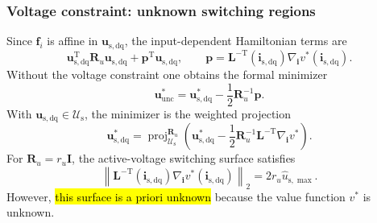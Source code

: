 \begin{frame}
	\frametitle{Voltage constraint: unknown switching regions}
	Since $\bm{f}_i$ is affine in $\bm{u}_{\mathrm{s,dq}}$, the input-dependent Hamiltonian terms are
	\begin{equation*}
		\bm{u}_{\mathrm{s,dq}}^{\mathrm{T}}\bm{R}_u\bm{u}_{\mathrm{s,dq}}
		+\bm{p}^{\mathrm{T}}\bm{u}_{\mathrm{s,dq}},
		\qquad
		\bm{p}=\bm{L}^{-\mathrm{T}}(\bm{i}_{\mathrm{s,dq}})
		\nabla_{\bm{i}}v^*(\bm{i}_{\mathrm{s,dq}}).
	\end{equation*}\pause%
	Without the voltage constraint one obtains the formal minimizer
	\begin{equation*}
		\bm{u}_{\mathrm{unc}}^*
		=\bm{u}_{\mathrm{s,dq}}^*-\frac{1}{2}\bm{R}_u^{-1}\bm{p}.
	\end{equation*}\pause%
	With $\bm{u}_{\mathrm{s,dq}}\in\mathcal{U}_\mathrm{s}$, the minimizer is the weighted projection
	\begin{equation*}
		\boxed{\bm{u}_{\mathrm{s,dq}}^*
			=\operatorname{proj}_{\mathcal{U}_\mathrm{s}}^{\bm{R}_u}
			\left(\bm{u}_{\mathrm{s,dq}}^*-\frac{1}{2}\bm{R}_u^{-1}\bm{L}^{-\mathrm{T}}
			\nabla_{\bm{i}}v^*\right).}
	\end{equation*}\pause%
	For $\bm{R}_u=r_u\bm{I}$, the active-voltage switching surface satisfies
	\begin{equation*}
		\left\|\bm{L}^{-\mathrm{T}}(\bm{i}_{\mathrm{s,dq}})
		\nabla_{\bm{i}}v^*(\bm{i}_{\mathrm{s,dq}})\right\|_2
		=2r_u\hat{u}_{\mathrm{s},\max} .
	\end{equation*}\pause%
	However, \hl{this surface is a priori unknown} because the value function $v^*$ is unknown.
\end{frame}

